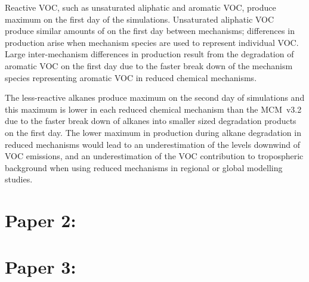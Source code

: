 Reactive VOC, such as unsaturated aliphatic and aromatic VOC, produce maximum  on the first day of the simulations.
Unsaturated aliphatic VOC produce similar amounts of  on the first day between mechanisms; differences in  production arise when mechanism species are used to represent individual VOC.
Large inter-mechanism differences in  production result from the degradation of aromatic VOC on the first day due to the faster break down of the mechanism species representing aromatic VOC in reduced chemical mechanisms.

The less-reactive alkanes produce maximum  on the second day of simulations and this maximum is lower in each reduced chemical mechanism than the MCM~v3.2 due to the faster break down of alkanes into smaller sized degradation products on the first day.
The lower maximum in  production during alkane degradation in reduced mechanisms would lead to an underestimation of the  levels downwind of VOC emissions, and an underestimation of the VOC contribution to tropospheric background  when using reduced mechanisms in regional or global modelling studies.

\section{Paper 2: } \label{s:EI_results}

\section{Paper 3: } \label{s:T-O3_results}
